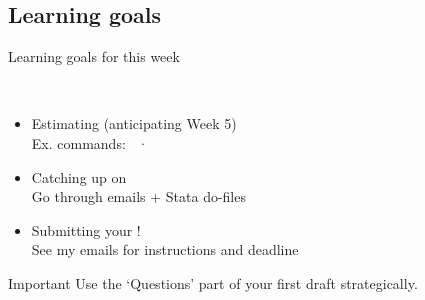 \documentclass[t]{beamer}
\begin{document}

  \subsection{Learning goals}

 \begin{frame}[t]{Learning goals for this week}

   \\[1em]

	\begin{itemize}
		\item Estimating  (anticipating Week 5)\\[.5em]%
      Ex. commands:  · \\[.5em]%
		\item Catching up on \\[.5em]%
      Go through emails + Stata do-files\\[.5em]%
		\item Submitting your !\\[.5em]%
      See my emails for instructions and deadline\\[.5em]%
	\end{itemize}

    \begin{alertblock}{Important}
       Use the `Questions' part of your first draft strategically.
    \end{alertblock}

  \end{frame}
\end{document}
